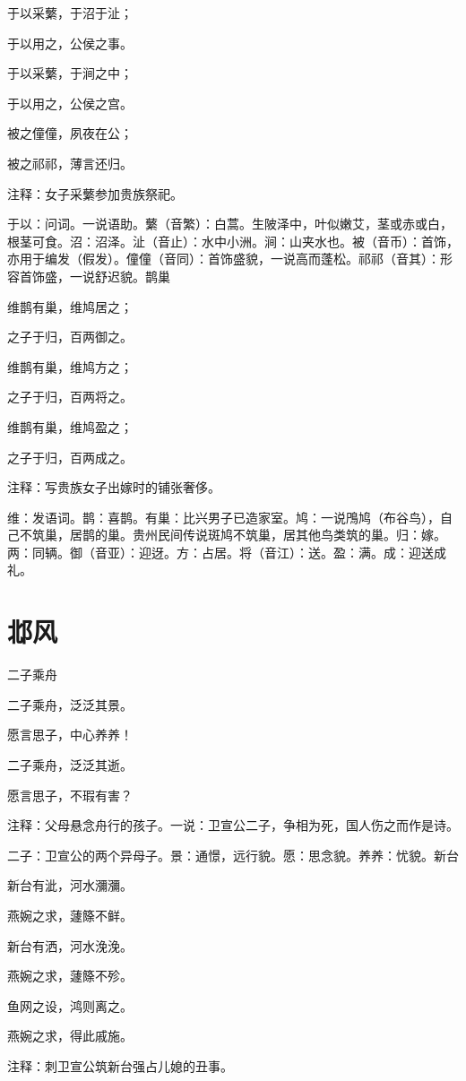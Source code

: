 \documentclass[12pt,UTF8]{ctexbook}
\begin{document}
于以采蘩，于沼于沚；

于以用之，公侯之事。

于以采蘩，于涧之中；

于以用之，公侯之宫。

被之僮僮，夙夜在公；

被之祁祁，薄言还归。

注释：女子采蘩参加贵族祭祀。

于以：问词。一说语助。蘩（音繁）：白蒿。生陂泽中，叶似嫩艾，茎或赤或白，根茎可食。沼：沼泽。沚（音止）：水中小洲。涧：山夹水也。被（音币）：首饰，亦用于编发（假发）。僮僮（音同）：首饰盛貌，一说高而蓬松。祁祁（音其）：形容首饰盛，一说舒迟貌。鹊巢

维鹊有巢，维鸠居之；

之子于归，百两御之。

维鹊有巢，维鸠方之；

之子于归，百两将之。

维鹊有巢，维鸠盈之；

之子于归，百两成之。

注释：写贵族女子出嫁时的铺张奢侈。

维：发语词。鹊：喜鹊。有巢：比兴男子已造家室。鸠：一说鳲鸠（布谷鸟），自己不筑巢，居鹊的巢。贵州民间传说斑鸠不筑巢，居其他鸟类筑的巢。归：嫁。两：同辆。御（音亚）：迎迓。方：占居。将（音江）：送。盈：满。成：迎送成礼。



\part{邶风}

二子乘舟 

二子乘舟，泛泛其景。

愿言思子，中心养养！

二子乘舟，泛泛其逝。

愿言思子，不瑕有害？

注释：父母悬念舟行的孩子。一说：卫宣公二子，争相为死，国人伤之而作是诗。

二子：卫宣公的两个异母子。景：通憬，远行貌。愿：思念貌。养养：忧貌。新台

新台有泚，河水瀰瀰。

燕婉之求，蘧篨不鲜。

新台有洒，河水浼浼。

燕婉之求，蘧篨不殄。

鱼网之设，鸿则离之。

燕婉之求，得此戚施。

注释：刺卫宣公筑新台强占儿媳的丑事。
\end{document}
